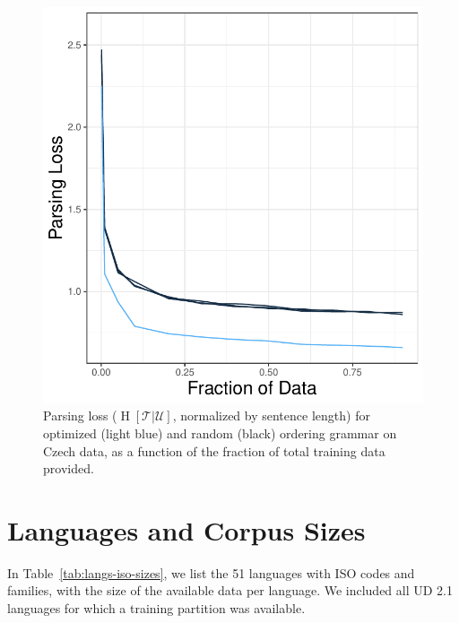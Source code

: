 \documentclass[10pt,twoside,lineno]{article}
\newcommand{\utterance}{\mathcal{U}}
\newcommand{\tree}{\mathcal{T}}
\begin{document}
\begin{figure}[ht]
    \centering
    \includegraphics[scale=.4]{../results/learning-curves/figures/learning-parser-czech-logloss.pdf} 

	\caption{Parsing loss ($\operatorname{H}[\tree|\utterance]$, normalized by sentence length) for optimized (light blue) and random (black) ordering grammar on Czech data, as a function of the fraction of total training data provided.}
    \label{fig:learning-czech}
\end{figure}











\section{Languages and Corpus Sizes}
In Table~\ref{tab:langs-iso-sizes}, we list the 51 languages with ISO codes and families, with the size of the available data per language.
We included all UD 2.1 languages for which a training partition was available.
\end{document}

